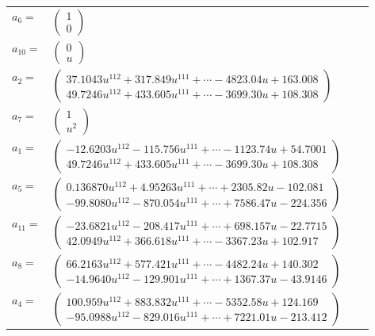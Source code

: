 \documentclass[1p]{elsarticle_modified}
\theoremstyle{definition}
\begin{document}
\begin{tabular}{m{7pt} m{180pt} m{7pt} m{180pt} }
\flushright $a_{6}=$&$\begin{pmatrix}1\\0\end{pmatrix}$ \\
\flushright $a_{10}=$&$\begin{pmatrix}0\\u\end{pmatrix}$ \\
\flushright $a_{2}=$&$\begin{pmatrix}37.1043 u^{112}+317.849 u^{111}+\cdots-4823.04 u+163.008\\49.7246 u^{112}+433.605 u^{111}+\cdots-3699.30 u+108.308\end{pmatrix}$ \\
\flushright $a_{7}=$&$\begin{pmatrix}1\\u^2\end{pmatrix}$ \\
\flushright $a_{1}=$&$\begin{pmatrix}-12.6203 u^{112}-115.756 u^{111}+\cdots-1123.74 u+54.7001\\49.7246 u^{112}+433.605 u^{111}+\cdots-3699.30 u+108.308\end{pmatrix}$ \\
\flushright $a_{5}=$&$\begin{pmatrix}0.136870 u^{112}+4.95263 u^{111}+\cdots+2305.82 u-102.081\\-99.8080 u^{112}-870.054 u^{111}+\cdots+7586.47 u-224.356\end{pmatrix}$ \\
\flushright $a_{11}=$&$\begin{pmatrix}-23.6821 u^{112}-208.417 u^{111}+\cdots+698.157 u-22.7715\\42.0949 u^{112}+366.618 u^{111}+\cdots-3367.23 u+102.917\end{pmatrix}$ \\
\flushright $a_{8}=$&$\begin{pmatrix}66.2163 u^{112}+577.421 u^{111}+\cdots-4482.24 u+140.302\\-14.9640 u^{112}-129.901 u^{111}+\cdots+1367.37 u-43.9146\end{pmatrix}$ \\
\flushright $a_{4}=$&$\begin{pmatrix}100.959 u^{112}+883.832 u^{111}+\cdots-5352.58 u+124.169\\-95.0988 u^{112}-829.016 u^{111}+\cdots+7221.01 u-213.412\end{pmatrix}$ \\

\end{tabular}
\end{document}
